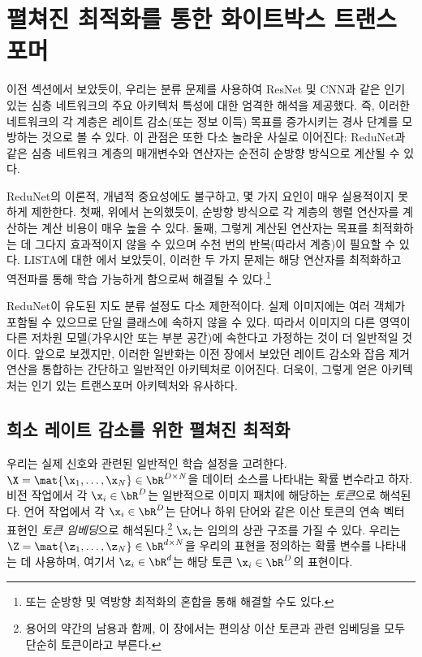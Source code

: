 \documentclass[../../book-main_ko.tex]{subfiles}
\begin{document}
\section{펼쳐진 최적화를 통한 화이트박스 트랜스포머}\label{sec:chap4-white-box-transformer}
이전 섹션에서 보았듯이, 우리는 분류 문제를 사용하여 ResNet 및 CNN과 같은 인기 있는 심층 네트워크의 주요 아키텍처 특성에 대한 엄격한 해석을 제공했다. 즉, 이러한 네트워크의 각 계층은 레이트 감소(또는 정보 이득) 목표를 증가시키는 경사 단계를 모방하는 것으로 볼 수 있다. 이 관점은 또한 다소 놀라운 사실로 이어진다: ReduNet과 같은 심층 네트워크 계층의 매개변수와 연산자는 순전히 순방향 방식으로 계산될 수 있다.

ReduNet의 이론적, 개념적 중요성에도 불구하고, 몇 가지 요인이 매우 실용적이지 못하게 제한한다. 첫째, 위에서 논의했듯이, 순방향 방식으로 각 계층의 행렬 연산자를 계산하는 계산 비용이 매우 높을 수 있다. 둘째, 그렇게 계산된 연산자는 목표를 최적화하는 데 그다지 효과적이지 않을 수 있으며 수천 번의 반복(따라서 계층)이 필요할 수 있다. LISTA에 대한 에서 보았듯이, 이러한 두 가지 문제는 해당 연산자를 최적화하고 역전파를 통해 학습 가능하게 함으로써 해결될 수 있다.\footnote{또는 순방향 및 역방향 최적화의 혼합을 통해 해결할 수도 있다.}

ReduNet이 유도된 지도 분류 설정도 다소 제한적이다. 실제 이미지에는 여러 객체가 포함될 수 있으므로 단일 클래스에 속하지 않을 수 있다. 따라서 이미지의 다른 영역이 다른 저차원 모델(가우시안 또는 부분 공간)에 속한다고 가정하는 것이 더 일반적일 것이다. 앞으로 보겠지만, 이러한 일반화는 이전 장에서 보았던 레이트 감소와 잡음 제거 연산을 통합하는 간단하고 일반적인 아키텍처로 이어진다. 더욱이, 그렇게 얻은 아키텍처는 인기 있는 트랜스포머 아키텍처와 유사하다.



\subsection{희소 레이트 감소를 위한 펼쳐진 최적화}



우리는 실제 신호와 관련된 일반적인 학습 설정을 고려한다. \(\X = \mat{\x_{1}, \dots, \x_{N}} \in \bR^{D \times N}\)을 데이터 소스를 나타내는 확률 변수라고 하자. 비전 작업에서 각 \(\x_{i} \in \bR^{D}\)는 일반적으로 이미지 패치에 해당하는 \textit{토큰}으로 해석된다. 언어 작업에서 각 \(\x_{i} \in \bR^{D}\)는 단어나 하위 단어와 같은 이산 토큰의 연속 벡터 표현인 \textit{토큰 임베딩}으로 해석된다.\footnote{용어의 약간의 남용과 함께, 이 장에서는 편의상 이산 토큰과 관련 임베딩을 모두 단순히 토큰이라고 부른다.}  %
\(\x_{i}\)는 임의의 상관 구조를 가질 수 있다. 우리는 \(\Z = \mat{\z_{1}, \dots, \z_{N}} \in \bR^{d \times N}\)을 우리의 표현을 정의하는 확률 변수를 나타내는 데 사용하며, 여기서 \(\z_{i} \in \bR^{d}\)는 해당 토큰 \(\x_i \in \bR^{D}\)의 표현이다.%
\end{document}
